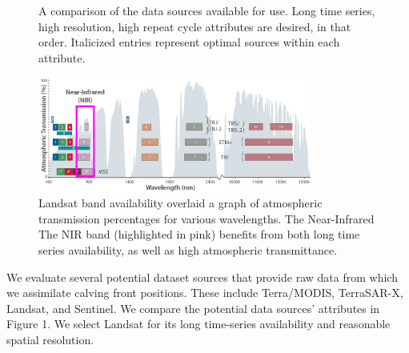 \documentclass[tc, manuscript]{copernicus}
\begin{document}
\begin{figure}
\noindent
\begin{minipage}{9.0cm}
    \caption{A comparison of the data sources available for use. Long time series, high resolution, high repeat cycle attributes are desired, in that order. Italicized entries represent optimal sources within each attribute. }
    \label{tab:table-data_source}
\end{minipage}

\begin{minipage}{9.0cm}
    \includegraphics[width=9.0cm]{all_Landsat_bands_annotated.png}
    \caption{Landsat band availability overlaid a graph of atmospheric transmission percentages for various wavelengths. The Near-Infrared The NIR band (highlighted in pink) benefits from both long time series availability, as well as high atmospheric transmittance.}
\end{minipage}
\end{figure}

We evaluate several potential dataset sources that provide raw data from which we assimilate calving front positions. These include Terra/MODIS, TerraSAR-X, Landsat, and Sentinel. We compare the potential data sources' attributes in Figure 1. We select Landsat for its long time-series availability and reasonable spatial resolution.
\end{document}
